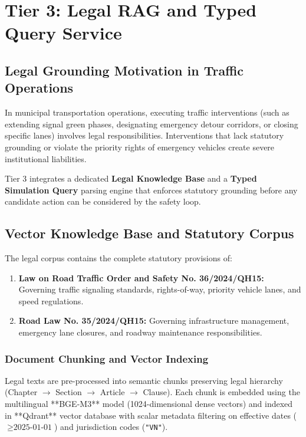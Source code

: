 \chapter{Tier 3: Legal RAG and Typed Query Service}
\label{chapter:tier3}

\section{Legal Grounding Motivation in Traffic Operations}
In municipal transportation operations, executing traffic interventions (such as extending signal green phases, designating emergency detour corridors, or closing specific lanes) involves legal responsibilities. Interventions that lack statutory grounding or violate the priority rights of emergency vehicles create severe institutional liabilities.

Tier 3 integrates a dedicated \textbf{Legal Knowledge Base} and a \textbf{Typed Simulation Query} parsing engine that enforces statutory grounding before any candidate action can be considered by the safety loop.

\section{Vector Knowledge Base and Statutory Corpus}
The legal corpus contains the complete statutory provisions of:
\begin{enumerate}[leftmargin=1.5cm, label=\textbf{\arabic*.}]
  \item \textbf{Law on Road Traffic Order and Safety No. 36/2024/QH15:} Governing traffic signaling standards, rights-of-way, priority vehicle lanes, and speed regulations.
  \item \textbf{Road Law No. 35/2024/QH15:} Governing infrastructure management, emergency lane closures, and roadway maintenance responsibilities.
\end{enumerate}

\subsection{Document Chunking and Vector Indexing}
Legal texts are pre-processed into semantic chunks preserving legal hierarchy (Chapter $\rightarrow$ Section $\rightarrow$ Article $\rightarrow$ Clause). Each chunk is embedded using the multilingual **BGE-M3** model (1024-dimensional dense vectors) and indexed in **Qdrant** vector database with scalar metadata filtering on effective dates ($\ge \text{2025-01-01}$) and jurisdiction codes (\texttt{"VN"}).

